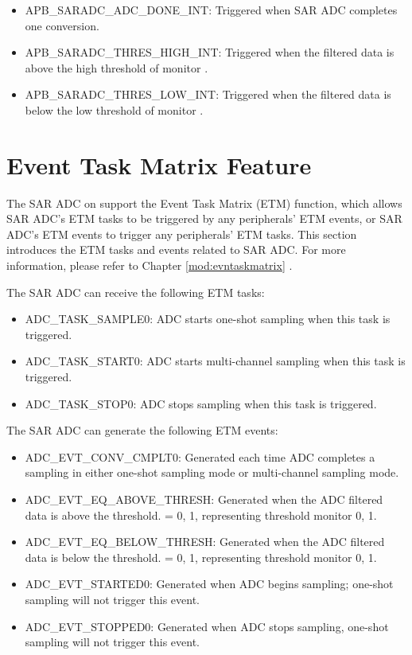 \documentclass[main\_\_EN.tex]{subfiles}
\begin{document}
\begin{itemize}
    \item \label{int:SARADCDONEINT1} APB\_SARADC\_ADC\_DONE\_INT: Triggered when SAR ADC completes one conversion.
    \item \label{int:APBSARADCTHRESxHIGHINT} APB\_SARADC\_THRES\_HIGH\_INT: Triggered when the filtered data is above the high threshold of monitor .
    \item \label{int:APBSARADCTHRESxLOWINT} APB\_SARADC\_THRES\_LOW\_INT: Triggered when the filtered data is below the low threshold of monitor .
\end{itemize}


\section{Event Task Matrix Feature}
\label{sec:adc-etm-func}

The SAR ADC on \chipname{} support the Event Task Matrix (ETM) function, which allows SAR ADC's ETM tasks to be triggered by any peripherals' ETM events, or SAR ADC's ETM events to trigger any peripherals' ETM tasks. This section introduces the ETM tasks and events related to SAR ADC. For more information, please refer to Chapter \ref{mod:evntaskmatrix} .

The SAR ADC can receive the following ETM tasks:

\begin{itemize}
    \item ADC\_TASK\_SAMPLE0: ADC starts one-shot sampling when this task is triggered.
    \item ADC\_TASK\_START0: ADC starts multi-channel sampling when this task is triggered.
    \item ADC\_TASK\_STOP0: ADC stops sampling when this task is triggered.
\end{itemize}

The SAR ADC can generate the following ETM events:

\begin{itemize}
    \item ADC\_EVT\_CONV\_CMPLT0: Generated each time ADC completes a sampling in either one-shot sampling mode or multi-channel sampling mode.
    \item ADC\_EVT\_EQ\_ABOVE\_THRESH: Generated when the ADC filtered data is above the threshold.  = 0, 1, representing threshold monitor 0, 1.
    \item ADC\_EVT\_EQ\_BELOW\_THRESH: Generated when the ADC filtered data is below the threshold.  = 0, 1, representing threshold monitor 0, 1.
    \item ADC\_EVT\_STARTED0: Generated when ADC begins sampling; one-shot sampling will not trigger this event.
    \item ADC\_EVT\_STOPPED0: Generated when ADC stops sampling, one-shot sampling will not trigger this event.
\end{itemize}
\end{document}
